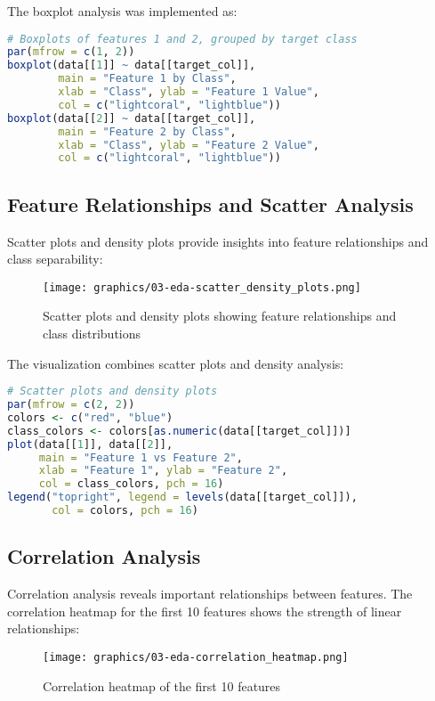 The boxplot analysis was implemented as:

\begin{lstlisting}[language=R]
# Boxplots of features 1 and 2, grouped by target class
par(mfrow = c(1, 2))
boxplot(data[[1]] ~ data[[target_col]], 
        main = "Feature 1 by Class",
        xlab = "Class", ylab = "Feature 1 Value",
        col = c("lightcoral", "lightblue"))
boxplot(data[[2]] ~ data[[target_col]], 
        main = "Feature 2 by Class",
        xlab = "Class", ylab = "Feature 2 Value",
        col = c("lightcoral", "lightblue"))
\end{lstlisting}

\subsection{Feature Relationships and Scatter Analysis}
Scatter plots and density plots provide insights into feature relationships and class separability:

\begin{figure}[H]
\centering
\texttt{[image: graphics/03-eda-scatter\_density\_plots.png]}
\caption{Scatter plots and density plots showing feature relationships and class distributions}
\label{fig:scatter-density}
\end{figure}

The visualization combines scatter plots and density analysis:

\begin{lstlisting}[language=R]
# Scatter plots and density plots
par(mfrow = c(2, 2))
colors <- c("red", "blue")
class_colors <- colors[as.numeric(data[[target_col]])]
plot(data[[1]], data[[2]], 
     main = "Feature 1 vs Feature 2", 
     xlab = "Feature 1", ylab = "Feature 2", 
     col = class_colors, pch = 16)
legend("topright", legend = levels(data[[target_col]]), 
       col = colors, pch = 16)
\end{lstlisting}

\subsection{Correlation Analysis}
Correlation analysis reveals important relationships between features. The correlation heatmap for the first 10 features shows the strength of linear relationships:

\begin{figure}[H]
\centering
\texttt{[image: graphics/03-eda-correlation\_heatmap.png]}
\caption{Correlation heatmap of the first 10 features}
\label{fig:correlation-heatmap}
\end{figure}


